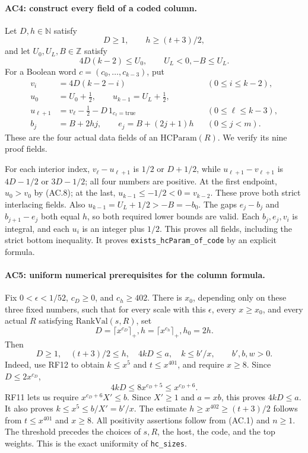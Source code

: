 \paragraph{AC4: construct every field of a coded column.}
Let $D,h\in\mathbb N$ satisfy
\[
        D\geq1,\qquad h\geq(t+3)/2,
\]
and let $U_0,U_L,B\in\mathbb Z$ satisfy
\[
             4D(k-2)\leq U_0,\qquad U_L<0,
                         -B\leq U_L.                        \tag{AC.8}
\]
For a Boolean word $c=(c_0,\ldots,c_{k-3})$, put
\[
 \begin{split}
 v_i&=4D(k-2-i) &&(0\leq i\leq k-2),\\
 u_0&=U_0+\tfrac12,\qquad
 u_{k-1}=U_L+\tfrac12,\\
 u_{\ell+1}&=v_\ell-\tfrac12-D\,1_{c_\ell=\mathrm{true}}
                                     &&(0\leq\ell\leq k-3),\\
 b_j&=B+2hj,\qquad e_j=B+(2j+1)h &&(0\leq j<m).
 \end{split}                                                 \tag{AC.9}
\]
These are the four actual data fields of an $\mathrm{HCParam}(R)$.
We verify its nine proof fields.

For each interior index, $v_\ell-u_{\ell+1}$ is $1/2$ or
$D+1/2$, while
$u_{\ell+1}-v_{\ell+1}$ is $4D-1/2$ or $3D-1/2$;
all four numbers are positive. At the first endpoint,
$u_0>v_0$ by (AC.8); at the last, $u_{k-1}\leq-1/2<0=v_{k-2}$.
These prove both strict interlacing fields. Also
$u_{k-1}=U_L+1/2>-B=-b_0$.
The gaps $e_j-b_j$ and $b_{j+1}-e_j$ both equal $h$, so both
required lower bounds are valid. Each $b_j,e_j,v_i$ is integral,
and each $u_i$ is an integer plus $1/2$.
This proves all fields, including the strict bottom inequality.
It proves \texttt{exists\_hcParam\_of\_code} by an explicit formula.

\paragraph{AC5: uniform numerical prerequisites for the column formula.}
Fix $0<\epsilon<1/52$, $c_D\geq0$, and $c_h\geq402$.
There is $x_0$, depending only on these three fixed numbers, such that
for every scale with this $\epsilon$, every $x\geq x_0$, and every
actual $R$ satisfying $\mathrm{RankVal}(s,R)$, set
\[
                  D=\lceil x^{c_D}\rceil_+,
             h=\lceil x^{c_h}\rceil_+,
                    h_0=2h.                                \tag{AC.10}
\]
Then
\[
 D\geq1,\quad (t+3)/2\leq h,\quad 4kD\leq a,
       \quad k\leq b'/x,\qquad b',b,w>0.                    \tag{AC.11}
\]
Indeed, use RF12 to obtain $k\leq x^5$ and $t\leq x^{401}$,
and require $x\geq8$. Since $D\leq2x^{c_D}$,
\[
       4kD\leq8x^{c_D+5}\leq x^{c_D+6}.
\]
RF11 lets us require $x^{c_D+6}X'\leq b$.
Since $X'\geq1$ and $a=xb$, this proves $4kD\leq a$.
It also proves $k\leq x^5\leq b/X'=b'/x$.
The estimate $h\geq x^{402}\geq(t+3)/2$ follows from
$t\leq x^{401}$ and $x\geq8$.
All positivity assertions follow from (AC.1) and $n\geq1$.
The threshold precedes the choices of $s,R$, the host, the code,
and the top weights. This is the exact uniformity of
\texttt{hc\_sizes}.

